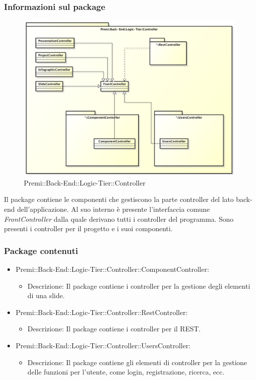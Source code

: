 	\subsubsection*{Informazioni sul package}
	\begin{figure}[h]
		\centering
		\includegraphics[width=0.9\linewidth]{img/back-end_logic-tier_controller}
		\caption[Premi::Back-End::Logic-Tier::Controller]{Premi::Back-End::Logic-Tier::Controller}
	\end{figure}
	Il package contiene le componenti che gestiscono la parte controller del lato back-end dell'applicazione. Al suo interno è presente l'interfaccia comune \textit{FrontController} dalla quale derivano tutti i controller del programma.
	Sono presenti i controller per il progetto e i suoi componenti.

	\subsubsection*{Package contenuti}
		\begin{itemize}
			\item Premi::Back-End::Logic-Tier::Controller::ComponentController:
			\begin{itemize}
				\item Descrizione: Il package contiene i controller per la gestione degli elementi di una slide.
			\end{itemize}
			
			\item Premi::Back-End::Logic-Tier::Controller::RestController:
			\begin{itemize}
				\item Descrizione: Il package contiene i controller per il REST.
			\end{itemize}
			
			\item Premi::Back-End::Logic-Tier::Controller::UsersController:
			\begin{itemize}
				\item Descrizione: Il package contiene gli elementi di controller per la gestione delle funzioni per l'utente, come login, registrazione, ricerca, ecc.
			\end{itemize}
		\end{itemize}
		
